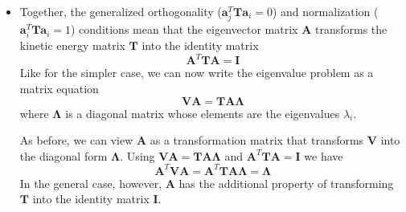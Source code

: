 \documentclass[11pt, a4paper]{article}
\newcommand{\mat}[1]{\mathbf{#1}}
\begin{document}
\begin{itemize}
	\item Together, the generalized orthogonality ($ \mat{a}_{j}^{T} \mat{T} \bm{a}_{i} = 0 $) and normalization ($ \bm{a}_{i}^{T} \mat{T} \bm{a}_{i} = 1 $) conditions mean that the eigenvector matrix $ \mat{A} $ transforms the kinetic energy matrix $ \mat{T} $ into the identity matrix
	\begin{equation*}
		\mat{A}^{T} \mat{T} \mat{A} = \mat{I}
	\end{equation*}
	Like for the simpler case, we can now write the eigenvalue problem as a matrix equation 
	\begin{equation*}
		\mat{V} \mat{A} = \mat{T} \mat{A} \mat{\Lambda}
	\end{equation*}
	where $ \mat{\Lambda} $ is a diagonal matrix whose elements are the eigenvalues $ \lambda_{i} $. 
	
	As before, we can view $ \mat{A} $ as a transformation matrix that transforms $ \mat{V} $ into the diagonal form $ \mat{\Lambda} $. Using $ \mat{V} \mat{A} = \mat{T} \mat{A} \mat{\Lambda} $ and $ \mat{A}^{T} \mat{T} \mat{A} = \mat{I} $ we have
	\begin{equation*}
		\mat{A}^{T} \mat{V} \mat{A} = \mat{A}^{T} \mat{T} \mat{A}\mat{\Lambda} = \mat{\Lambda}
	\end{equation*}
	In the general case, however, $ \mat{A} $ has the additional property of transforming $ \mat{T} $ into the identity matrix $ \mat{I} $.
	
\end{itemize}
\end{document}
